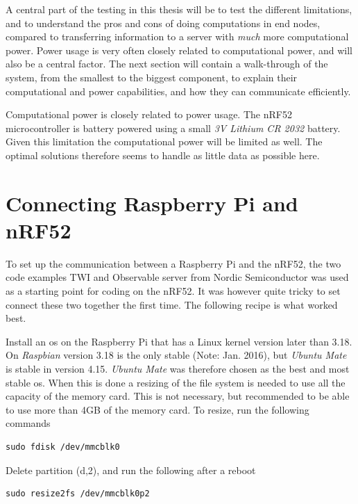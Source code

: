 A central part of the testing in this thesis will be to test the different limitations, and to understand the pros and cons of doing computations in end nodes, compared to transferring information to a server with \textit{much} more computational power. Power usage is very often closely related to computational power, and will also be a central factor. The next section will contain a walk-through of the system, from the smallest to the biggest component, to explain their computational and power capabilities, and how they can communicate efficiently. 

Computational power is closely related to power usage. The nRF52 microcontroller is battery powered using a small \textit{3V Lithium CR 2032} battery. Given this limitation the computational power will be limited as well. The optimal solutions therefore seems to handle as little data as possible here. 


\section{Connecting Raspberry Pi and nRF52}



To set up the communication between a Raspberry Pi and the nRF52, the two code examples TWI and Observable server from Nordic Semiconductor was used as a starting point for coding on the nRF52. It was however quite tricky to set connect these two together the first time. The following recipe is what worked best. 

Install an \gls{os} on the Raspberry Pi that has a Linux kernel version later than 3.18. On \textit{Raspbian} version 3.18 is the only stable (Note: Jan. 2016), but \textit{Ubuntu Mate} is stable in version 4.15. \textit{Ubuntu Mate} was therefore chosen as the best and most stable \gls{os}. When this is done a resizing of the file system is needed to use all the capacity of the memory card. This is not necessary, but recommended to be able to use more than 4GB of the memory card. To resize, run the following commands

\begin{verbatim}
sudo fdisk /dev/mmcblk0
\end{verbatim}

Delete partition (d,2), and run the following after a reboot

\begin{verbatim}
sudo resize2fs /dev/mmcblk0p2
\end{verbatim}

